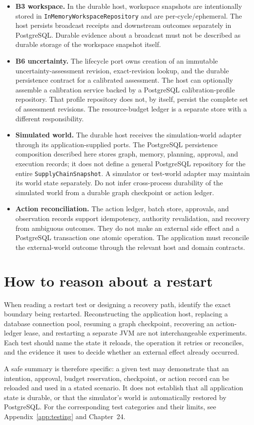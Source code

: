 \begin{itemize}
  \item \textbf{B3 workspace.} In the durable host, workspace snapshots are intentionally stored in \texttt{InMemoryWorkspace\allowbreak{}Repository} and are per-cycle/ephemeral. The host persists broadcast receipts and downstream outcomes separately in PostgreSQL. Durable evidence about a broadcast must not be described as durable storage of the workspace snapshot itself.
  \item \textbf{B6 uncertainty.} The lifecycle port owns creation of an immutable uncertainty-assessment revision, exact-revision lookup, and the durable persistence contract for a calibrated assessment. The host can optionally assemble a calibration service backed by a PostgreSQL calibration-profile repository. That profile repository does not, by itself, persist the complete set of assessment revisions. The resource-budget ledger is a separate store with a different responsibility.
  \item \textbf{Simulated world.} The durable host receives the simulation-world adapter through its application-supplied ports. The PostgreSQL persistence composition described here stores graph, memory, planning, approval, and execution records; it does not define a general PostgreSQL repository for the entire \texttt{SupplyChainSnapshot}. A simulator or test-world adapter may maintain its world state separately. Do not infer cross-process durability of the simulated world from a durable graph checkpoint or action ledger.
  \item \textbf{Action reconciliation.} The action ledger, batch store, approvals, and observation records support idempotency, authority revalidation, and recovery from ambiguous outcomes. They do not make an external side effect and a PostgreSQL transaction one atomic operation. The application must reconcile the external-world outcome through the relevant host and domain contracts.
\end{itemize}

\section{How to reason about a restart}

When reading a restart test or designing a recovery path, identify the exact boundary being restarted. Reconstructing the application host, replacing a database connection pool, resuming a graph checkpoint, recovering an action-ledger lease, and restarting a separate JVM are not interchangeable experiments. Each test should name the state it reloads, the operation it retries or reconciles, and the evidence it uses to decide whether an external effect already occurred.

A safe summary is therefore specific: a given test may demonstrate that an intention, approval, budget reservation, checkpoint, or action record can be reloaded and used in a stated scenario. It does not establish that all application state is durable, or that the simulator's world is automatically restored by PostgreSQL. For the corresponding test categories and their limits, see Appendix~\ref{app:testing} and Chapter~24.
